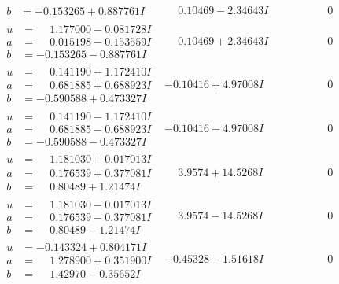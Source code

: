 \documentclass[1p]{elsarticle_modified}
\theoremstyle{definition}
\begin{document}
$$\begin{array}{c|c|c}
\begin{aligned}
b &= -0.153265 + 0.887761 I\end{aligned}
 & \phantom{-}0.10469 - 2.34643 I & \phantom{-0.000000 } 0 \\ \hline\begin{aligned}
u &= \phantom{-}1.177000 - 0.081728 I \\
a &= \phantom{-}0.015198 - 0.153559 I \\
b &= -0.153265 - 0.887761 I\end{aligned}
 & \phantom{-}0.10469 + 2.34643 I & \phantom{-0.000000 } 0 \\ \hline\begin{aligned}
u &= \phantom{-}0.141190 + 1.172410 I \\
a &= \phantom{-}0.681885 + 0.688923 I \\
b &= -0.590588 + 0.473327 I\end{aligned}
 & -0.10416 + 4.97008 I & \phantom{-0.000000 } 0 \\ \hline\begin{aligned}
u &= \phantom{-}0.141190 - 1.172410 I \\
a &= \phantom{-}0.681885 - 0.688923 I \\
b &= -0.590588 - 0.473327 I\end{aligned}
 & -0.10416 - 4.97008 I & \phantom{-0.000000 } 0 \\ \hline\begin{aligned}
u &= \phantom{-}1.181030 + 0.017013 I \\
a &= \phantom{-}0.176539 + 0.377081 I \\
b &= \phantom{-}0.80489 + 1.21474 I\end{aligned}
 & \phantom{-}3.9574 + 14.5268 I & \phantom{-0.000000 } 0 \\ \hline\begin{aligned}
u &= \phantom{-}1.181030 - 0.017013 I \\
a &= \phantom{-}0.176539 - 0.377081 I \\
b &= \phantom{-}0.80489 - 1.21474 I\end{aligned}
 & \phantom{-}3.9574 - 14.5268 I & \phantom{-0.000000 } 0 \\ \hline\begin{aligned}
u &= -0.143324 + 0.804171 I \\
a &= \phantom{-}1.278900 + 0.351900 I \\
b &= \phantom{-}1.42970 - 0.35652 I\end{aligned}
 & -0.45328 - 1.51618 I & \phantom{-0.000000 } 0 \\ \hline\begin{aligned}

\end{aligned}
\end{array}$$
\end{document}
